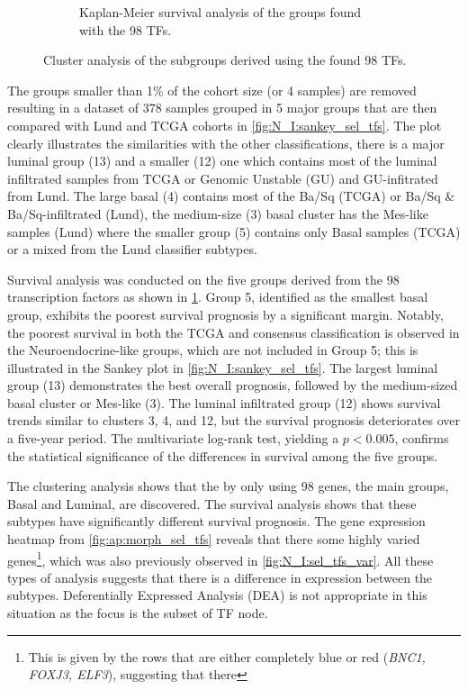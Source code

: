 \begin{figure}[!h]
\begin{subfigure}[!t]{0.5\textwidth}
    \caption{Kaplan-Meier survival analysis of the groups found with the 98 TFs. }
    
    \label{fig:N_I:sel_tfs_survival}
\end{subfigure}\hspace{\fill} %

    \caption{Cluster analysis of the subgroups derived using the found 98 TFs.}
    
    \label{fig:N_I:sel_tfs_cs_analysis}
\end{figure}

The groups smaller than 1\% of the cohort size (or 4 samples) are removed resulting in a dataset of 378 samples grouped in 5 major groups that are then compared with Lund \citet{Marzouka2018-ge} and TCGA \citet{Robertson2017-mg} cohorts in \cref{fig:N_I:sankey_sel_tfs}. The plot clearly illustrates the similarities with the other classifications, there is a major luminal group (13) and a smaller (12) one which contains most of the luminal infiltrated samples from TCGA or Genomic Unstable (GU) and GU-infitrated from Lund.  The large basal (4) contains most of the Ba/Sq (TCGA) or Ba/Sq \& Ba/Sq-infiltrated (Lund), the medium-size (3) basal cluster has the Mes-like samples (Lund) where the smaller group (5) contains only Basal samples (TCGA) or a mixed from the Lund classifier subtypes.

Survival analysis was conducted on the five groups derived from the 98 transcription factors as shown in \cref{fig:N_I:sel_tfs_survival}. Group 5, identified as the smallest basal group, exhibits the poorest survival prognosis by a significant margin. Notably, the poorest survival in both the TCGA and consensus classification is observed in the Neuroendocrine-like groups, which are not included in Group 5; this is illustrated in the Sankey plot in \cref{fig:N_I:sankey_sel_tfs}. The largest luminal group (13) demonstrates the best overall prognosis, followed by the medium-sized basal cluster or Mes-like (3). The luminal infiltrated group (12) shows survival trends similar to clusters 3, 4, and 12, but the survival prognosis deteriorates over a five-year period. The multivariate log-rank test, yielding a $p<0.005$, confirms the statistical significance of the differences in survival among the five groups.

The clustering analysis shows that the by only using 98 genes, the main groups, Basal and Luminal, are discovered. The survival analysis shows that these subtypes have significantly different survival prognosis. The gene expression heatmap from \cref{fig:ap:morph_sel_tfs} reveals that there some highly varied genes\footnote{This is given by the rows that are either completely blue or red (\textit{BNC1, FOXJ3, ELF3}), suggesting that there }, which was also previously observed in \cref{fig:N_I:sel_tfs_var}. All these types of analysis suggests that there is a difference in expression between the subtypes. Deferentially Expressed Analysis (DEA) is not appropriate in this situation as the focus is the subset of TF node. 

